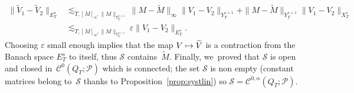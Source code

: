 \documentclass[JEP,XML,SOM,Unicode,published]{cedram}
\newcommand\mto{\mathchoice{\longmapsto}{\mapsto}{\mapsto}{\mapsto}}
\theoremstyle{definition}
\let\ep\varepsilon
\begin{document}
\begin{align*}
\|\widetilde{V}_1-\widetilde{V}_{2}\|_{E_T^s} &\lesssim_{T,[M]_\alpha,\|M\|_{Y_T^{s+1}}} \|M\!-\!\widetilde{M}\|_\infty \|V_1\!-\!V_2\|_{Y_T^{s+1}} + \|M\!-\!\widetilde{M}\|_{Y_T^{s+1}} \|V_1\!-\!V_2\|_{X_T^s}\\
&\lesssim_{T,[M]_\alpha,\|M\|_{Y_T^{s+1}}} \ep \|V_1-V_2\|_{E_T^s}.
\end{align*}
Choosing $\ep$ small enough implies that the map $V\mto \widetilde{V}$ is a contraction from the Banach space $E_T^s$ to itself, thus $\mathscr{S}$ contains~$\widetilde{M}$. Finally, we~proved that $\mathscr{S}$ is open and closed in~$\mathscr{C}^0(Q_T;\mathscr{P})$ which is connected; the set $\mathscr{S}$ is non empty (constant matrices belong to~$\mathscr{S}$ thanks to Proposition~\ref{prop:systlin}) so $\mathscr{S}=\mathscr{C}^{0,\alpha}(Q_T;\mathscr{P})$.
\end{document}

